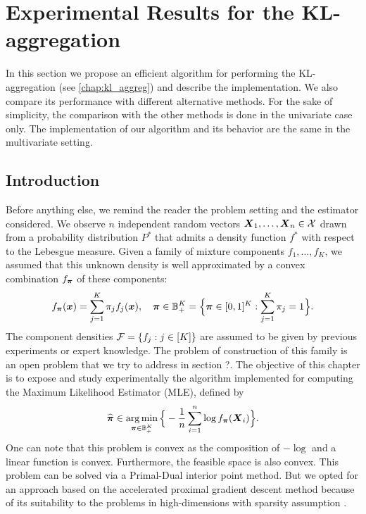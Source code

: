 
\chapter{Experimental Results for the KL-aggregation}
\minitoc
In this section we propose an efficient algorithm for performing the KL-aggregation (see \cref{chap:kl_aggreg}) and describe the implementation. We also compare its performance with different alternative methods. For the sake of simplicity, the comparison with the other methods is done in the univariate case only. The implementation of our algorithm and its behavior are the same in the multivariate setting.

\section{Introduction}
Before anything else, we remind the reader the problem setting and the estimator considered. We observe $n$ independent random vectors $\boldsymbol X_1,\ldots,\boldsymbol X_n\in\mathcal X$ drawn from a probability distribution $P^*$ that admits a density function $f^*$ with respect to the Lebesgue measure. Given a family of mixture components $f_1,\ldots,f_K$, we assumed that this unknown density is well approximated by a convex combination $f_{\boldsymbol \pi}$ of these components:
\begin{equation}
f_{\boldsymbol \pi}(\boldsymbol x)=\sum_{j=1}^K\pi_j f_j(\boldsymbol x), \quad \boldsymbol \pi \in {\mathbb B}_+^K=\Big\{\boldsymbol \pi\in [0,1]^K: \sum_{j=1}^K\pi_j=1\Big\}.
\end{equation}
The component densities $\mathcal F=\{f_j:j\in[K]\}$ are assumed to be given by previous experiments or expert knowledge. The problem of construction of this family is an open problem that we try to address in section ?. The objective of this chapter is to expose and study experimentally the algorithm implemented for computing the Maximum Likelihood Estimator (MLE), defined by
\begin{equation}
\label{MLE_2}
\widehat{\boldsymbol \pi} \in \operatorname*{arg\,min}_{\boldsymbol \pi\in {\mathbb B}_+^K}\Big\{-\frac{1}{n}\sum_{i=1}^n\log f_{\boldsymbol \pi}(\boldsymbol X_i)\Big\}.
\end{equation}
One can note that this problem is convex as the composition of $-\log$ and a linear function is convex. Furthermore, the feasible space is also convex. This problem can be solved via a Primal-Dual interior point method. But we opted for an approach based on the accelerated proximal gradient descent method because of its suitability to the problems in high-dimensions with sparsity assumption \citep{Beck:2009:FIS:1658360.1658364}.
